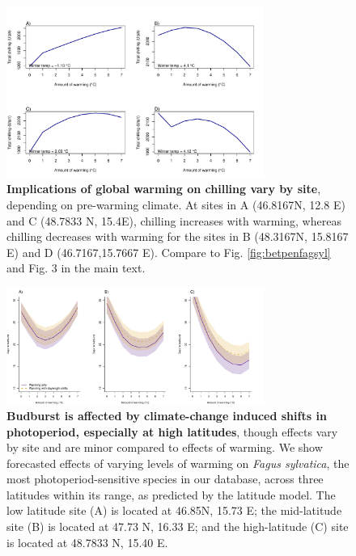 \documentclass{article}
\begin{document}
\begin{figure}[h!]
\centering
\noindent \includegraphics[width=0.75\textwidth]{..//..//analyses/bb_analysis/figures/forecasting/chillforecastbothspp_1_7_degwarm.pdf}
\caption{\textbf{Implications of global warming on chilling vary by site}, depending on pre-warming climate. At sites in A (46.8167\degree N, 12.8 \degree E) and C (48.7833 \degree N, 15.4\degree E), chilling increases with warming, whereas chilling decreases with warming for the sites in B (48.3167\degree N, 15.8167 \degree E) and D (46.7167,15.7667 \degree E). Compare to Fig. \ref{fig:betpenfagsyl} and Fig. 3 in the main text.}
\label{fig:chillfore}
\end{figure}

\begin{figure}[h!]
\centering
\noindent \includegraphics[width=0.75\textwidth]{..//..//analyses/bb_analysis/figures/forecasting/fagsyl_3lats.pdf}
\caption{\textbf{Budburst is affected by climate-change induced shifts in photoperiod, especially at high latitudes}, though effects vary by site and are minor compared to effects of warming. We show forecasted effects of varying levels of warming on \emph{Fagus sylvatica}, the most photoperiod-sensitive species in our database, across three latitudes within its range, as predicted by the latitude model. The low latitude site (A) is  located at 46.85\degree N, 15.73 \degree E; the mid-latitude site (B) is located at 47.73 \degree N, 16.33 \degree E; and the high-latitude (C) site is located at 48.7833 \degree N, 15.40 \degree E.}
\label{fig:fagsyllat}
\end{figure}
\end{document}
